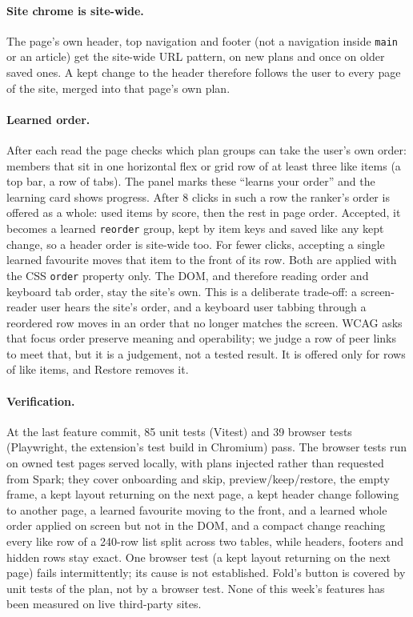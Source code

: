 \documentclass[10pt,a4paper]{article}
\begin{document}
\paragraph{Site chrome is site-wide.} The page's own header, top navigation and footer (not a navigation inside \texttt{main} or an article) get the site-wide URL pattern, on new plans and once on older saved ones. A kept change to the header therefore follows the user to every page of the site, merged into that page's own plan.

\paragraph{Learned order.} After each read the page checks which plan groups can take the user's own order: members that sit in one horizontal flex or grid row of at least three like items (a top bar, a row of tabs). The panel marks these ``learns your order'' and the learning card shows progress. After 8 clicks in such a row the ranker's order is offered as a whole: used items by score, then the rest in page order. Accepted, it becomes a learned \texttt{reorder} group, kept by item keys and saved like any kept change, so a header order is site-wide too. For fewer clicks, accepting a single learned favourite moves that item to the front of its row. Both are applied with the CSS \texttt{order} property only. The DOM, and therefore reading order and keyboard tab order, stay the site's own. This is a deliberate trade-off: a screen-reader user hears the site's order, and a keyboard user tabbing through a reordered row moves in an order that no longer matches the screen. WCAG asks that focus order preserve meaning and operability; we judge a row of peer links to meet that, but it is a judgement, not a tested result. It is offered only for rows of like items, and Restore removes it.

\paragraph{Verification.} At the last feature commit, 85 unit tests (Vitest) and 39 browser tests (Playwright, the extension's test build in Chromium) pass. The browser tests run on owned test pages served locally, with plans injected rather than requested from Spark; they cover onboarding and skip, preview/keep/restore, the empty frame, a kept layout returning on the next page, a kept header change following to another page, a learned favourite moving to the front, and a learned whole order applied on screen but not in the DOM, and a compact change reaching every like row of a 240-row list split across two tables, while headers, footers and hidden rows stay exact. One browser test (a kept layout returning on the next page) fails intermittently; its cause is not established. Fold's button is covered by unit tests of the plan, not by a browser test. None of this week's features has been measured on live third-party sites.
\end{document}
